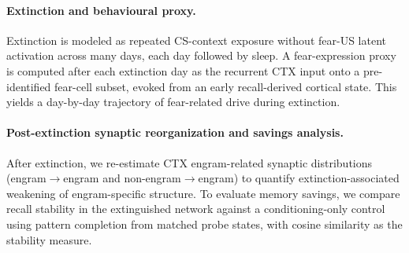 \documentclass{article}
\begin{document}
\paragraph{Extinction and behavioural proxy.}
Extinction is modeled as repeated CS-context exposure without fear-US latent activation across many days, each day followed by sleep. A fear-expression proxy is computed after each extinction day as the recurrent CTX input onto a pre-identified fear-cell subset, evoked from an early recall-derived cortical state. This yields a day-by-day trajectory of fear-related drive during extinction.

\paragraph{Post-extinction synaptic reorganization and savings analysis.}
After extinction, we re-estimate CTX engram-related synaptic distributions (engram$\rightarrow$engram and non-engram$\rightarrow$engram) to quantify extinction-associated weakening of engram-specific structure. To evaluate memory savings, we compare recall stability in the extinguished network against a conditioning-only control using pattern completion from matched probe states, with cosine similarity as the stability measure.
\end{document}

